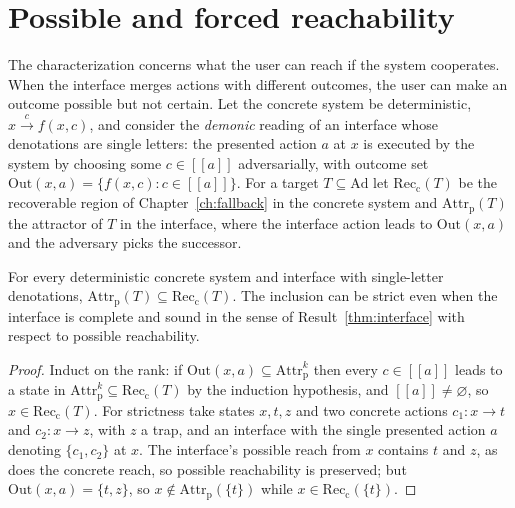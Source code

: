 \section{Possible and forced reachability}

The characterization concerns what the user can reach if the system cooperates. When the interface merges actions with different outcomes, the user can make an outcome possible but not certain. Let the concrete system be deterministic, $x\xrightarrow{c}f(x,c)$, and consider the \emph{demonic} reading of an interface whose denotations are single letters: the presented action $a$ at $x$ is executed by the system by choosing some $c\in[\![a]\!]$ adversarially, with outcome set $\mathrm{Out}(x,a)=\{f(x,c):c\in[\![a]\!]\}$. For a target $T\subseteq\mathrm{Ad}$ let $\mathrm{Rec}_{\mathrm c}(T)$ be the recoverable region of Chapter~\ref{ch:fallback} in the concrete system and $\mathrm{Attr}_{\mathrm p}(T)$ the attractor of $T$ in the interface, where the interface action leads to $\mathrm{Out}(x,a)$ and the adversary picks the successor.

\begin{newresult}\label{prop:forced-interface}
For every deterministic concrete system and interface with single-letter denotations, $\mathrm{Attr}_{\mathrm p}(T)\subseteq\mathrm{Rec}_{\mathrm c}(T)$. The inclusion can be strict even when the interface is complete and sound in the sense of Result~\ref{thm:interface} with respect to possible reachability.
\end{newresult}
\begin{proof}
Induct on the rank: if $\mathrm{Out}(x,a)\subseteq\mathrm{Attr}^{k}_{\mathrm p}$ then every $c\in[\![a]\!]$ leads to a state in $\mathrm{Attr}^{k}_{\mathrm p}\subseteq\mathrm{Rec}_{\mathrm c}(T)$ by the induction hypothesis, and $[\![a]\!]\neq\varnothing$, so $x\in\mathrm{Rec}_{\mathrm c}(T)$. For strictness take states $x,t,z$ and two concrete actions $c_1:x\to t$ and $c_2:x\to z$, with $z$ a trap, and an interface with the single presented action $a$ denoting $\{c_1,c_2\}$ at $x$. The interface's possible reach from $x$ contains $t$ and $z$, as does the concrete reach, so possible reachability is preserved; but $\mathrm{Out}(x,a)=\{t,z\}$, so $x\notin\mathrm{Attr}_{\mathrm p}(\{t\})$ while $x\in\mathrm{Rec}_{\mathrm c}(\{t\})$.
\end{proof}

